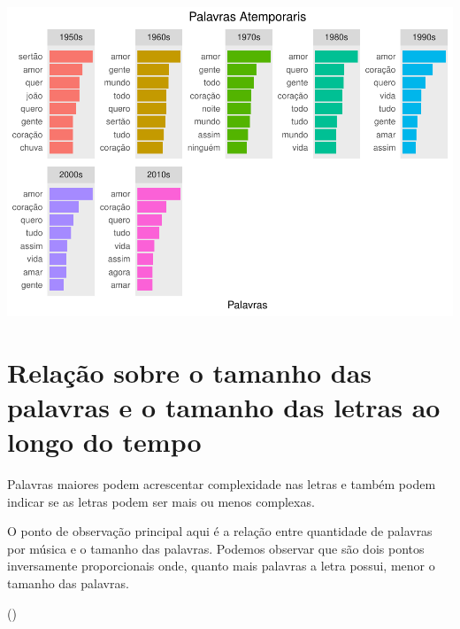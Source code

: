 \documentclass[]{article}
\begin{document}
\includegraphics{avaliacaoLetrasDeForro_files/figure-latex/unnamed-chunk-7-1.pdf}

\hypertarget{relacao-sobre-o-tamanho-das-palavras-e-o-tamanho-das-letras-ao-longo-do-tempo}{%
\section{Relação sobre o tamanho das palavras e o tamanho das letras ao
longo do
tempo}\label{relacao-sobre-o-tamanho-das-palavras-e-o-tamanho-das-letras-ao-longo-do-tempo}}

Palavras maiores podem acrescentar complexidade nas letras e também
podem indicar se as letras podem ser mais ou menos complexas.

O ponto de observação principal aqui é a relação entre quantidade de
palavras por música e o tamanho das palavras. Podemos observar que são
dois pontos inversamente proporcionais onde, quanto mais palavras a
letra possui, menor o tamanho das palavras.

()
\end{document}

